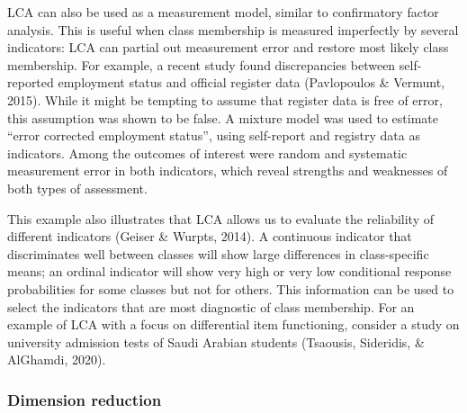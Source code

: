 \documentclass[
  ,man,floatsintext]{apa6}
\begin{document}
LCA can also be used as a measurement model, similar to confirmatory factor analysis.
This is useful when class membership is measured imperfectly by several indicators:
LCA can partial out measurement error and restore most likely class membership.
For example, a recent study found discrepancies between self-reported employment status and official register data (Pavlopoulos \& Vermunt, 2015).
While it might be tempting to assume that register data is free of error, this assumption was shown to be false.
A mixture model was used to estimate ``error corrected employment status'', using self-report and registry data as indicators.
Among the outcomes of interest were random and systematic measurement error in both indicators,
which reveal strengths and weaknesses of both types of assessment.

This example also illustrates that LCA allows us to evaluate the reliability of different indicators (Geiser \& Wurpts, 2014).
A continuous indicator that discriminates well between classes will show large differences in class-specific means;
an ordinal indicator will show very high or very low conditional response probabilities for some classes but not for others.
This information can be used to select the indicators that are most diagnostic of class membership.
For an example of LCA with a focus on differential item functioning,
consider a study on university admission tests of Saudi Arabian students (Tsaousis, Sideridis, \& AlGhamdi, 2020).

\hypertarget{dimension-reduction}{%
\subsubsection{Dimension reduction}\label{dimension-reduction}}
\end{document}

